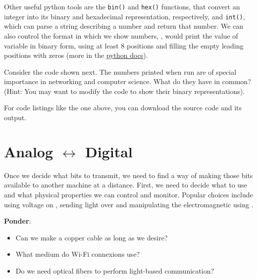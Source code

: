 Other useful python tools are the \texttt{bin()} and \texttt{hex()} functions, that convert an integer 
into its binary and hexadecimal representation, respectively, and \texttt{int()}, which can parse
a string describing a number and return that number. We can also control the format in which we show numbers,
\eg,  would print the value of variable  in binary form, 
using at least 8 positions and filling the empty leading positions with zeros
(more in the \href{https://docs.python.org/3/reference/lexical_analysis.html#f-strings}{python docs}).

\begin{exercise}
Consider the code shown next. The numbers printed when run are of special importance in networking and computer science.
What do they have in common? (Hint: You may want to modify the code to show their binary representations).

\begin{center}
\end{center}
\label{ex:bitwisemanipulation}
\end{exercise}
\begin{remark}
For code listings like the one above, you can download the source code and its output.
\end{remark}


\section{Analog $\leftrightarrow$ Digital}\label{sec:piercing:analog_digital}

Once we decide what bits to transmit, we need to find a way of making those bits available to another machine at a distance.
First, we need to decide what  to use and what physical properties we can control and monitor.
Popular choices include using voltage on , sending light over  and manipulating the 
electromagnetic  using .

\begin{exercise} \textbf{Ponder}:\\[-0.5cm]
\begin{itemize}
\item Can we make a copper cable as long as we desire?
\item What medium do Wi-Fi connexions use? 
\item Do we need optical fibers to perform light-based communication?
\end{itemize}
\end{exercise}


